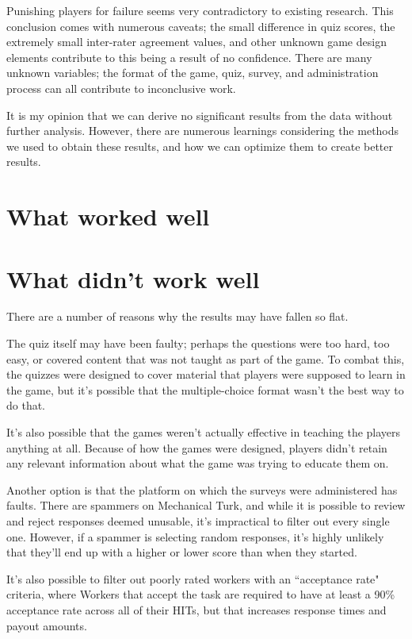 \documentclass[12pt]{report}
\begin{document}
	Punishing players for failure seems very contradictory to existing research. This conclusion comes with numerous caveats; the small difference in quiz scores, the extremely small inter-rater agreement values, and other unknown game design elements contribute to this being a result of no confidence. There are many unknown variables; the format of the game, quiz, survey, and administration process can all contribute to inconclusive work.

	It is my opinion that we can derive no significant results from the data without further analysis. However, there are numerous learnings considering the methods we used to obtain these results, and how we can optimize them to create better results.

	\section{What worked well}
	\section{What didn't work well}
		There are a number of reasons why the results may have fallen so flat.

		The quiz itself may have been faulty; perhaps the questions were too hard, too easy, or covered content that was not taught as part of the game. To combat this, the quizzes were designed to cover material that players were supposed to learn in the game, but it's possible that the multiple-choice format wasn't the best way to do that.

		It's also possible that the games weren't actually effective in teaching the players anything at all. Because of how the games were designed, players didn't retain any relevant information about what the game was trying to educate them on.

		Another option is that the platform on which the surveys were administered has faults. There are spammers on Mechanical Turk, and while it is possible to review and reject responses deemed unusable, it's impractical to filter out every single one. However, if a spammer is selecting random responses, it's highly unlikely that they'll end up with a higher or lower score than when they started. 

		It's also possible to filter out poorly rated workers with an ``acceptance rate" criteria, where Workers that accept the task are required to have at least a 90\% acceptance rate across all of their HITs, but that increases response times and payout amounts.
\end{document}
